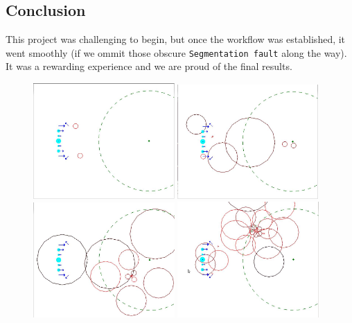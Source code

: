 \documentclass[a4paper]{article} %
\begin{document}
\begin{multicols*}{2}
\section{Conclusion}
This project was challenging to begin, but once the workflow was established, it went smoothly
(if we ommit those obscure \texttt{Segmentation fault} along the way).
It was a rewarding experience and we are proud of the final results.

\begin{figure}[H]
\centering
\includegraphics[width=0.48\textwidth]{1.jpg}
\includegraphics[width=0.48\textwidth]{2.jpg}
\includegraphics[width=0.48\textwidth]{3.jpg}
\includegraphics[width=0.48\textwidth]{4.jpg}

\end{figure}
\end{multicols*}
\end{document}
